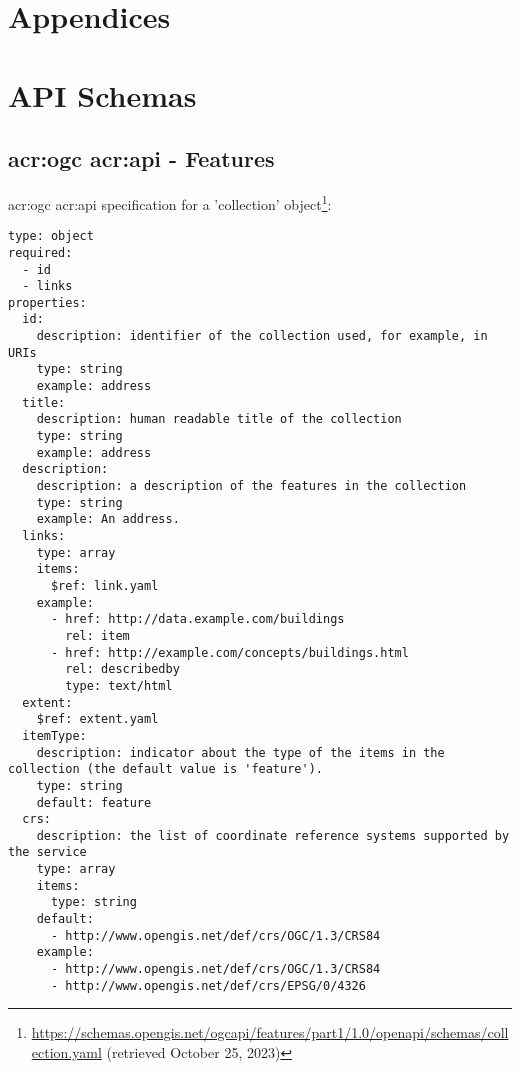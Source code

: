 \appendix

\chapter*{Appendices}
\label{cha:appendices}

\begin{comment}
\chapter{Proof of the First Zonklar Equation}
\label{app:zonklar}

Appendix one text goes here.

\chapter{Structured Literature Review (SLR) Protocol}
\label{app:slr}

Appendix two text goes here.
\end{comment}

\label{app:task-description}

\chapter{API Schemas}

\section[OGC API - Features]{\acrshort{acr:ogc} \acrshort{acr:api} - Features}

\acrshort{acr:ogc} \acrshort{acr:api} specification for a 'collection' object\footnote{\url{https://schemas.opengis.net/ogcapi/features/part1/1.0/openapi/schemas/collection.yaml} (retrieved October 25, 2023)}:

\begin{lstlisting}[style=yaml]
type: object
required:
  - id
  - links
properties:
  id:
    description: identifier of the collection used, for example, in URIs
    type: string
    example: address
  title:
    description: human readable title of the collection
    type: string
    example: address
  description:
    description: a description of the features in the collection
    type: string
    example: An address.
  links:
    type: array
    items:
      $ref: link.yaml
    example:
      - href: http://data.example.com/buildings
        rel: item
      - href: http://example.com/concepts/buildings.html
        rel: describedby
        type: text/html
  extent:
    $ref: extent.yaml
  itemType:
    description: indicator about the type of the items in the collection (the default value is 'feature').
    type: string
    default: feature
  crs:
    description: the list of coordinate reference systems supported by the service
    type: array
    items:
      type: string
    default:
      - http://www.opengis.net/def/crs/OGC/1.3/CRS84
    example:
      - http://www.opengis.net/def/crs/OGC/1.3/CRS84
      - http://www.opengis.net/def/crs/EPSG/0/4326
  \end{lstlisting}

